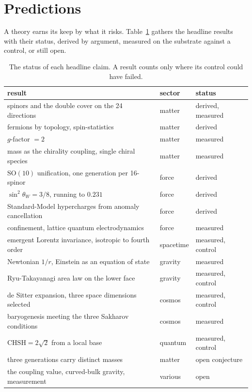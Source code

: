 \section{Predictions}

A theory earns its keep by what it risks. Table~\ref{tab:status} gathers the headline results with their status, derived by argument, measured on the substrate against a control, or still open.

\begin{table}[ht]
\centering
\small
\begin{tabular}{@{}lll@{}}
\toprule
result & sector & status \\
\midrule
spinors and the double cover on the 24 directions & matter & derived, measured \\
fermions by topology, spin-statistics & matter & derived \\
$g$-factor $= 2$ & matter & measured \\
mass as the chirality coupling, single chiral species & matter & measured \\
$\mathrm{SO}(10)$ unification, one generation per 16-spinor & force & derived \\
$\sin^2\theta_W = 3/8$, running to $0.231$ & force & derived \\
Standard-Model hypercharges from anomaly cancellation & force & derived \\
confinement, lattice quantum electrodynamics & force & measured \\
emergent Lorentz invariance, isotropic to fourth order & spacetime & measured, control \\
Newtonian $1/r$, Einstein as an equation of state & gravity & measured \\
Ryu-Takayanagi area law on the lower face & gravity & measured, control \\
de Sitter expansion, three space dimensions selected & cosmos & measured, control \\
baryogenesis meeting the three Sakharov conditions & cosmos & measured \\
$\mathrm{CHSH} = 2\sqrt{2}$ from a local base & quantum & measured, control \\
three generations carry distinct masses & matter & open conjecture \\
the coupling value, curved-bulk gravity, measurement & various & open \\
\bottomrule
\end{tabular}
\caption{The status of each headline claim. A result counts only where its control could have failed.}
\label{tab:status}
\end{table}

